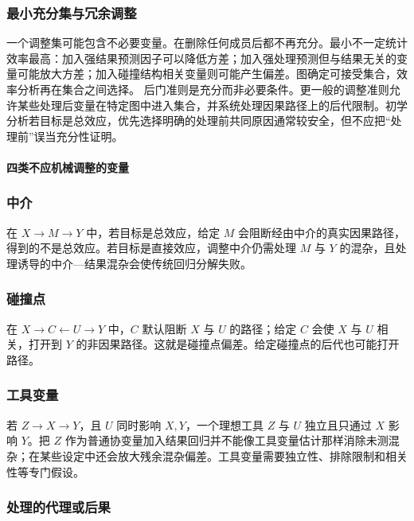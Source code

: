 \subsubsection{最小充分集与冗余调整}

一个调整集可能包含不必要变量。在删除任何成员后都不再充分。最小不一定统计效率最高：加入强结果预测因子可以降低方差；加入强处理预测但与结果无关的变量可能放大方差；加入碰撞结构相关变量则可能产生偏差。图确定可接受集合，效率分析再在集合之间选择。
后门准则是充分而非必要条件。更一般的调整准则允许某些处理后变量在特定图中进入集合，并系统处理因果路径上的后代限制\parencite{shpitser2010,perkovic2018}。初学分析若目标是总效应，优先选择明确的处理前共同原因通常较安全，但不应把“处理前”误当充分性证明。

\paragraph{四类不应机械调整的变量}

\subsubsection{中介}

在 $X\rightarrow M\rightarrow Y$ 中，若目标是总效应，给定 $M$ 会阻断经由中介的真实因果路径，得到的不是总效应。若目标是直接效应，调整中介仍需处理 $M$ 与 $Y$ 的混杂，且处理诱导的中介---结果混杂会使传统回归分解失败。

\subsubsection{碰撞点}

在 $X\rightarrow C\leftarrow U\rightarrow Y$ 中，$C$ 默认阻断 $X$ 与 $U$ 的路径；给定 $C$ 会使 $X$ 与 $U$ 相关，打开到 $Y$ 的非因果路径。这就是碰撞点偏差。给定碰撞点的后代也可能打开路径。

\subsubsection{工具变量}

若 $Z\rightarrow X\rightarrow Y$，且 $U$ 同时影响 $X,Y$，一个理想工具 $Z$ 与 $U$ 独立且只通过 $X$ 影响 $Y$。把 $Z$ 作为普通协变量加入结果回归并不能像工具变量估计那样消除未测混杂；在某些设定中还会放大残余混杂偏差。工具变量需要独立性、排除限制和相关性等专门假设。

\subsubsection{处理的代理或后果}

